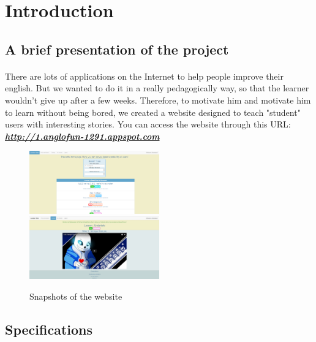 \section{Introduction} %

\subsection{A brief presentation of the project}

\paragraph{}

There are lots of applications on the Internet to help people improve their english. But we wanted to do it in a really pedagogically way, so that the learner wouldn't give up after a few weeks. Therefore, to motivate him and motivate him to learn without being bored, we created a website designed to teach "student" users with interesting stories. \linebreak
You can access the website through this URL: \textbf{\emph{\url{http://1.anglofun-1291.appspot.com}}} \linebreak

\begin{figure}[!ht]
    \includegraphics[width=0.5\textwidth]{./images/snapshot1.png}
    \includegraphics[width=0.5\textwidth]{./images/snapshot2.jpg}
    \caption{Snapshots of the website}
\end{figure}

\subsection{Specifications}

